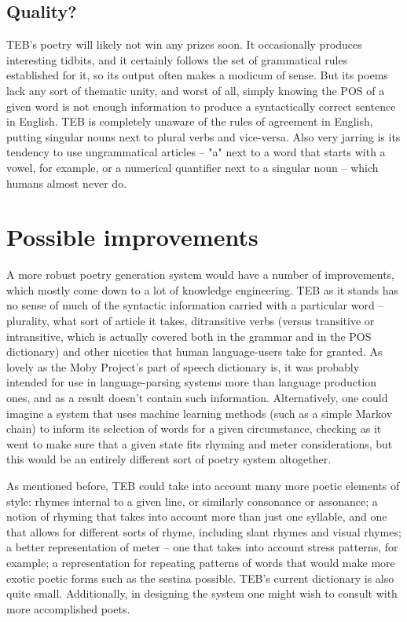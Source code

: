 \documentclass[12pt]{article}
\begin{document}
\subsection{Quality?}
TEB's poetry will likely not win any prizes soon. It occasionally produces
interesting tidbits, and it certainly follows the set of grammatical rules
established for it, so its output often makes a modicum of sense. But its
poems lack any sort of thematic unity, and worst of all, simply knowing the
POS of a given word is not enough information to produce a syntactically
correct sentence in English. TEB is completely unaware of the rules of
agreement in English, putting singular nouns next to plural verbs and
vice-versa. Also very jarring is its tendency to use ungrammatical articles
-- "a" next to a word that starts with a vowel, for example, or a numerical
quantifier next to a singular noun -- which humans almost never do.

\section{Possible improvements}
A more robust poetry generation system would have a number of improvements,
which mostly come down to a lot of knowledge engineering. TEB as it stands
has no sense of much of the syntactic information carried with a particular
word -- plurality, what sort of article it takes, ditransitive verbs (versus
transitive or intransitive, which is actually covered both in the grammar
and in the POS dictionary) and other niceties that human language-users
take for granted. As lovely as the Moby Project's part of speech dictionary
is, it was probably intended for use in language-parsing systems more than
language production ones, and as a result doesn't contain such information.
Alternatively, one could imagine a system that uses machine learning
methods (such as a simple Markov chain) to inform its selection of words
for a given circumstance, checking as it went to make sure that a given
state fits rhyming and meter considerations, but this would be an entirely
different sort of poetry system altogether.

\bigskip
As mentioned before, TEB could take into account many more poetic elements
of style: rhymes internal to a given line, or similarly consonance or
assonance; a notion of rhyming that takes into account more than just one
syllable, and one that allows for different sorts of rhyme, including slant
rhymes and visual rhymes; a better representation of meter -- one that
takes into account stress patterns, for example; a representation for
repeating patterns of words that would make more exotic poetic forms such
as the sestina possible. TEB's current dictionary is also quite small.
Additionally, in designing the system one might wish to consult with more
accomplished poets.
\end{document}
